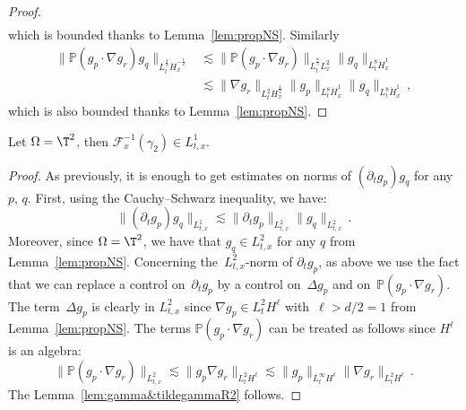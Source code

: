\begin{proof}
\begin{align*}
\end{align*}
which is bounded thanks to Lemma~\ref{lem:propNS}. Similarly
\begin{align*}
\|{\mathbb P}(g_p \cdot\nabla g_r)g_q\|_{L^\frac43_{t} \dot H^{-\frac12}_{x} } & \lesssim \| {\mathbb P}(g_p \cdot\nabla g_r)\|_{L^\frac85_{t} L^2_{x}} \| g_q\|_{L^8 _{t} \dot H^{ 1}_{x} }\\
& \lesssim \| \nabla g_r\|_{L^2_{t} \dot H^{ \frac12}_{x}} \| g_p \|_{L^8 _{t} \dot H^{ 1}_{x} } \| g_q \|_{L^8 _{t} \dot H^{ 1}_{x} }\,,
\end{align*}
which is also bounded thanks to Lemma~\ref{lem:propNS}.
\end{proof}

\begin{lemm}\label{lem:gamma&tildegammaT2}
Let $\Omega = \T^2$, then {$\mathcal{F}_x^{-1}(\gamma_2) \in L^1_{t,x}$}.
\end{lemm}
\begin{proof}
As previously, it is enough to get estimates on norms of $(\partial_t g_p)g_q$ for any~$p$, $q$. First, using the Cauchy--Schwarz inequality, we have:
\[
\|(\partial_t g_{p}) g_{q} \|_{L^1_{t,x}} \lesssim \|\partial_t g_{p} \|_{L^2_{t,x}} \| g_{q} \|_{L^2_{t,x}} \,.
\]
Moreover, since $\Omega = \T^2$, we have that $g_q \in L^2_{t,x}$ for any $q$ from Lemma~\ref{lem:propNS}. Concerning the~$L^2_{t,x}$-norm of $\partial_t g_{p} $, as above we use the fact that we can replace a control on~$\partial_t g_{p}$ by a control on~$\Delta g_p$ and on~${\mathbb P}(g_p \cdot\nabla g_r)$. The term~$\Delta g_{p} $ is clearly in $L^2_{t,x}$ since $\nabla g_{p} \in L^2_t H^{\ell}$ with~$\ell>d/2=1$ from Lemma~\ref{lem:propNS}. The terms ${\mathbb P}(g_p \cdot\nabla g_r)$ can be treated as follows since $H^\ell$ is an algebra:
\[
\|{\mathbb P}(g_p \cdot\nabla g_r)\|_{L^2_{t,x}} \lesssim \|g_p \nabla g_r\|_{L^2_{t} H^\ell}
\lesssim \|g_p\|_{L^\infty_t H^\ell} \|\nabla g_r\|_{L^2_t H^\ell } \,.
\]
The Lemma~\ref{lem:gamma&tildegammaR2} follows.
\end{proof}
\goodbreak


